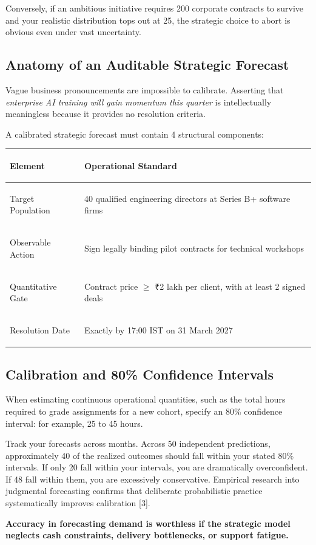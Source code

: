 Conversely, if an ambitious initiative requires 200 corporate contracts to survive and your realistic distribution tops out at 25, the strategic choice to abort is obvious even under vast uncertainty.

\subsection{Anatomy of an Auditable Strategic Forecast}

Vague business pronouncements are impossible to calibrate. Asserting that \textit{enterprise AI training will gain momentum this quarter} is intellectually meaningless because it provides no resolution criteria.

A calibrated strategic forecast must contain 4 structural components:

\begin{tcolorbox}[
  enhanced,
  colback=BayesSurface!60,
  colframe=BayesBorder,
  boxrule=0.5pt,
  arc=3pt,
  left=3pt,right=3pt,top=3pt,bottom=3pt,
  boxsep=1pt
]
\scriptsize
\begin{tabularx}{\linewidth}{>{\bfseries\raggedright\arraybackslash}p{2.2cm} X}
\toprule
\textbf{Element} & \textbf{Operational Standard} \\
\midrule
Target Population & 40 qualified engineering directors at Series B+ software firms \\
\addlinespace[2pt]
Observable Action & Sign legally binding pilot contracts for technical workshops \\
\addlinespace[2pt]
Quantitative Gate & Contract price $\ge$ ₹2 lakh per client, with at least 2 signed deals \\
\addlinespace[2pt]
Resolution Date & Exactly by 17:00 IST on 31 March 2027 \\
\bottomrule
\end{tabularx}
\end{tcolorbox}

\subsection{Calibration and 80\% Confidence Intervals}

When estimating continuous operational quantities, such as the total hours required to grade assignments for a new cohort, specify an 80\% confidence interval: for example, 25 to 45 hours.

Track your forecasts across months. Across 50 independent predictions, approximately 40 of the realized outcomes should fall within your stated 80\% intervals. If only 20 fall within your intervals, you are dramatically overconfident. If 48 fall within them, you are excessively conservative. Empirical research into judgmental forecasting confirms that deliberate probabilistic practice systematically improves calibration [3].

\textbf{Accuracy in forecasting demand is worthless if the strategic model neglects cash constraints, delivery bottlenecks, or support fatigue.}
